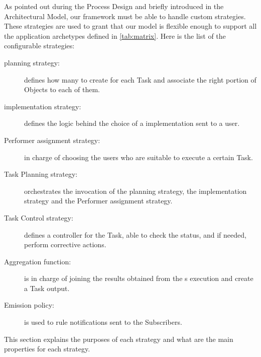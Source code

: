 
As pointed out during the Process Design and briefly introduced in the 
Architectural Model, our framework must be able to handle custom strategies. These strategies
are used to grant that our model is flexible enough to support all the application
archetypes defined in \autoref{tab:matrix}. Here is the list of the configurable
strategies:
\begin{description}
    \item[\utask{} planning strategy:] defines how many \utask{} to create for
    each Task and associate the right portion of Objects to each of them.
    \item[\utask{} implementation strategy:] defines the logic behind the choice
    of a \utask{} implementation sent to a user.
    \item[Performer assignment strategy:] in charge of choosing the users who
    are suitable to execute a certain Task.
    \item[Task Planning strategy:] orchestrates the invocation of the \utask{}
    planning strategy, the \utask{} implementation strategy and the Performer
    assignment strategy.
    \item[Task Control strategy:] defines a controller for the Task, able to
    check the status, and if needed, perform corrective actions.
    \item[Aggregation function:] is in charge of joining the results obtained
    from the \utask{}s execution and create a Task output.
    \item[Emission policy:] is used to rule notifications sent to the Subscribers.
\end{description}

\noindent This section explains the purposes of each strategy and what are the
main properties for each strategy.


